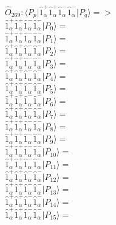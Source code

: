 \documentclass[14pt]{article}
\begin{document}
    $\hat{O}_{269}:  \langle{P_p}\vert \hat{1}_{\alpha}^{+}\hat{1}_{\alpha}^{+}\hat{1}_{\alpha}^{-}\hat{1}_{\alpha}^{-} \vert{P_q}\rangle => $ \\ 
    $ \hat{1}_{\alpha}^{+}\hat{1}_{\alpha}^{+}\hat{1}_{\alpha}^{-}\hat{1}_{\alpha}^{-} \vert{P_{0}}\rangle =  $ \\ 
    $ \hat{1}_{\alpha}^{+}\hat{1}_{\alpha}^{+}\hat{1}_{\alpha}^{-}\hat{1}_{\alpha}^{-} \vert{P_{1}}\rangle =  $ \\ 
    $ \hat{1}_{\alpha}^{+}\hat{1}_{\alpha}^{+}\hat{1}_{\alpha}^{-}\hat{1}_{\alpha}^{-} \vert{P_{2}}\rangle =  $ \\ 
    $ \hat{1}_{\alpha}^{+}\hat{1}_{\alpha}^{+}\hat{1}_{\alpha}^{-}\hat{1}_{\alpha}^{-} \vert{P_{3}}\rangle =  $ \\ 
    $ \hat{1}_{\alpha}^{+}\hat{1}_{\alpha}^{+}\hat{1}_{\alpha}^{-}\hat{1}_{\alpha}^{-} \vert{P_{4}}\rangle =  $ \\ 
    $ \hat{1}_{\alpha}^{+}\hat{1}_{\alpha}^{+}\hat{1}_{\alpha}^{-}\hat{1}_{\alpha}^{-} \vert{P_{5}}\rangle =  $ \\ 
    $ \hat{1}_{\alpha}^{+}\hat{1}_{\alpha}^{+}\hat{1}_{\alpha}^{-}\hat{1}_{\alpha}^{-} \vert{P_{6}}\rangle =  $ \\ 
    $ \hat{1}_{\alpha}^{+}\hat{1}_{\alpha}^{+}\hat{1}_{\alpha}^{-}\hat{1}_{\alpha}^{-} \vert{P_{7}}\rangle =  $ \\ 
    $ \hat{1}_{\alpha}^{+}\hat{1}_{\alpha}^{+}\hat{1}_{\alpha}^{-}\hat{1}_{\alpha}^{-} \vert{P_{8}}\rangle =  $ \\ 
    $ \hat{1}_{\alpha}^{+}\hat{1}_{\alpha}^{+}\hat{1}_{\alpha}^{-}\hat{1}_{\alpha}^{-} \vert{P_{9}}\rangle =  $ \\ 
    $ \hat{1}_{\alpha}^{+}\hat{1}_{\alpha}^{+}\hat{1}_{\alpha}^{-}\hat{1}_{\alpha}^{-} \vert{P_{10}}\rangle =  $ \\ 
    $ \hat{1}_{\alpha}^{+}\hat{1}_{\alpha}^{+}\hat{1}_{\alpha}^{-}\hat{1}_{\alpha}^{-} \vert{P_{11}}\rangle =  $ \\ 
    $ \hat{1}_{\alpha}^{+}\hat{1}_{\alpha}^{+}\hat{1}_{\alpha}^{-}\hat{1}_{\alpha}^{-} \vert{P_{12}}\rangle =  $ \\ 
    $ \hat{1}_{\alpha}^{+}\hat{1}_{\alpha}^{+}\hat{1}_{\alpha}^{-}\hat{1}_{\alpha}^{-} \vert{P_{13}}\rangle =  $ \\ 
    $ \hat{1}_{\alpha}^{+}\hat{1}_{\alpha}^{+}\hat{1}_{\alpha}^{-}\hat{1}_{\alpha}^{-} \vert{P_{14}}\rangle =  $ \\ 
    $ \hat{1}_{\alpha}^{+}\hat{1}_{\alpha}^{+}\hat{1}_{\alpha}^{-}\hat{1}_{\alpha}^{-} \vert{P_{15}}\rangle =  $ \\ 
    
\end{document}

